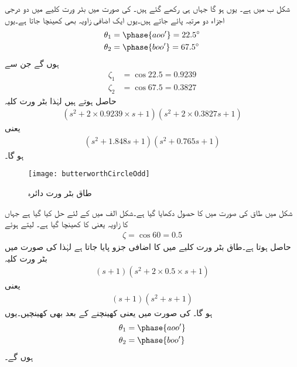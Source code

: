 شکل  ب میں  ہے۔
یوں  ہو گا جہاں  ہی رکھے گئے ہیں۔ کی  صورت میں بٹر ورت کلیے میں دو درجی اجزاء دو مرتبہ پائے جاتے ہیں۔یوں ایک اضافی زاویہ  بھی کھینچا جاتا ہے۔یوں
\begin{align*}
\theta_1&=\phase{aoo'}=\SI{22.5}{\degree}\\
\theta_2&=\phase{boo'}=\SI{67.5}{\degree}
\end{align*}
ہوں گے جن سے
\begin{align*}
\zeta_1&=\cos 22.5=0.9239\\
\zeta_2&=\cos 67.5=0.3827
\end{align*}
حاصل ہوتے ہیں لہٰذا بٹر ورت کلیہ     
\begin{align*}
\left(s^2+2 \times 0.9239 \times s +1\right) \left(s^2+2 \times 0.3827s+1 \right)
\end{align*}
یعنی
\begin{align*}
\left(s^2+1.848s +1\right) \left(s^2+0.765s+1 \right)
\end{align*}
ہو گا۔
%
\begin{figure}
\centering
\texttt{[image: butterworthCircleOdd]}
\caption{طاق بٹر ورت دائرہ}
\label{شکل_تعددی_ردعمل_بٹر_ورت_دائرہ_طاق}
\end{figure}
شکل  میں طاق  کی صورت میں  کا حصول دکھایا گیا ہے۔شکل  الف میں  کے لئے حل کیا گیا ہے جہاں  کا زاویہ  یعنی  کا کھینچا گیا ہے۔ لیتے ہوئے
\begin{align*}
\zeta=\cos 60=0.5
\end{align*}
حاصل ہوتا ہے۔طاق بٹر ورت کلیے      میں  کا اضافی جزو پایا جاتا ہے لہٰذا  کی صورت میں بٹر ورت کلیہ     
\begin{align*}
\left(s+1 \right)\left(s^2+2 \times 0.5 \times s+ 1\right)
\end{align*}
یعنی
\begin{align*}
\left(s+1 \right)\left(s^2+ s+1 \right)
\end{align*}
ہو گا۔ کی صورت میں  یعنی  کھینچنے کے بعد  بھی  کھینچیں۔یوں
\begin{align*}
\theta_1&=\phase{aoo'}\\
\theta_2&=\phase{boo'}
\end{align*}
ہوں گے۔

